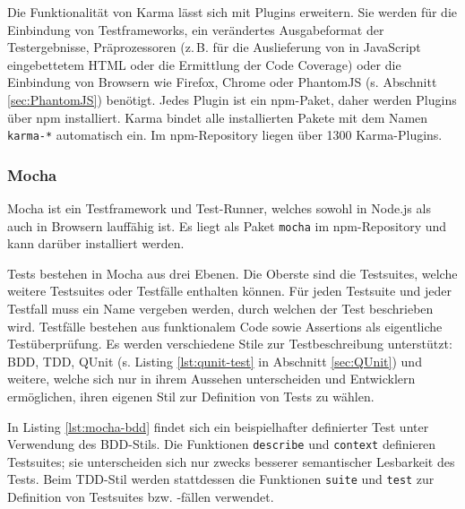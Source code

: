 \begin{figure}[H]
	
\end{figure}

Die Funktionalität von Karma lässt sich mit Plugins erweitern. Sie werden für die Einbindung von Testframeworks, ein verändertes Ausgabeformat der Testergebnisse, Präprozessoren (z.\,B. für die Auslieferung von in JavaScript eingebettetem HTML oder die Ermittlung der Code Coverage)\cite{karma-preprocessors} oder die Einbindung von Browsern wie Firefox, Chrome oder PhantomJS (s. Abschnitt \ref{sec:PhantomJS}) benötigt. Jedes Plugin ist ein npm-Paket, daher werden Plugins über npm installiert. Karma bindet alle installierten Pakete mit dem Namen \texttt{karma-*} automatisch ein.\cite{karma-plugins} Im npm-Repository liegen über 1300 Karma-Plugins.\cite{karma-npm}

\subsubsection{Mocha}
\label{sec:Mocha}
Mocha ist ein Testframework und Test-Runner, welches sowohl in Node.js als auch in Browsern lauffähig ist. Es liegt als Paket \texttt{mocha} im npm-Repository und kann darüber installiert werden.\cite{mocha-index}

Tests bestehen in Mocha aus drei Ebenen. Die Oberste sind die Testsuites, welche weitere Testsuites oder Testfälle enthalten können. Für jeden Testsuite und jeder Testfall muss ein Name vergeben werden, durch welchen der Test beschrieben wird. Testfälle bestehen aus funktionalem Code sowie Assertions als eigentliche Testüberprüfung. Es werden verschiedene Stile zur Testbeschreibung unterstützt: BDD, TDD, QUnit (s. Listing \ref{lst:qunit-test} in Abschnitt \ref{sec:QUnit}) und weitere, welche sich nur in ihrem Aussehen unterscheiden und Entwicklern ermöglichen, ihren eigenen Stil zur Definition von Tests zu wählen.\cite{mocha-index}

\begin{figure}[H]
	
\end{figure}

In Listing \ref{lst:mocha-bdd} findet sich ein beispielhafter definierter Test unter Verwendung des BDD-Stils. Die Funktionen \texttt{describe} und \texttt{context} definieren Testsuites; sie unterscheiden sich nur zwecks besserer semantischer Lesbarkeit des Tests. Beim TDD-Stil werden stattdessen die Funktionen \texttt{suite} und \texttt{test} zur Definition von Testsuites bzw. -fällen verwendet.\cite{mocha-index}

